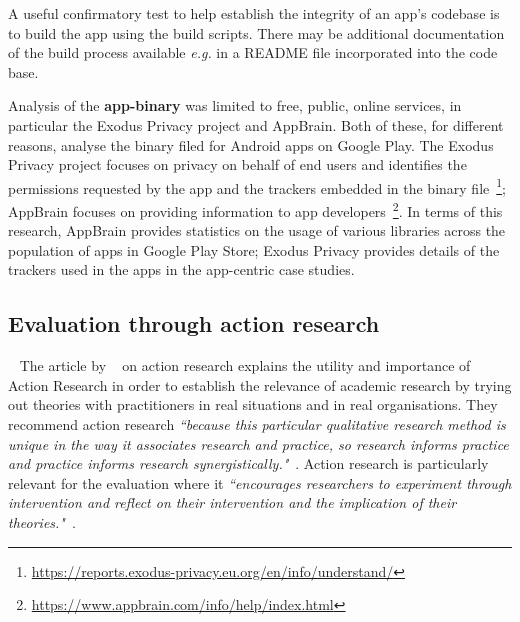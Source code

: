 A useful confirmatory test to help establish the integrity of an app's codebase is to build the app using the build scripts. There may be additional documentation of the build process available \textit{e.g.} in a README file incorporated into the code base.

Analysis of the \textbf{app-binary} was limited to free, public, online services, in particular the Exodus Privacy project and AppBrain. Both of these, for different reasons, analyse the binary filed for Android apps on Google Play. The Exodus Privacy project focuses on privacy on behalf of end users and identifies the permissions requested by the app and the trackers embedded in the binary file~\footnote{\url{https://reports.exodus-privacy.eu.org/en/info/understand/}}; AppBrain focuses on providing information to app developers~\footnote{\url{https://www.appbrain.com/info/help/index.html}}. In terms of this research, AppBrain provides statistics on the usage of various libraries across the population of apps in Google Play Store; Exodus Privacy provides details of the trackers used in the apps in the app-centric case studies.

\subsection{Evaluation through action research}~\label{section-evaluation-through-action-research-method}
The article by ~\citet*{avison1999_action_research} on action research explains the utility and importance of Action Research in order to establish the relevance of academic research by trying out theories with practitioners in real situations and in real organisations. They recommend action research \emph{``because this particular qualitative research method is unique in the way it associates research and practice, so research informs practice and practice informs research synergistically."}~\citep[p.94]{avison1999_action_research}. Action research is particularly relevant for the evaluation where it \emph{``encourages researchers to experiment through intervention and reflect on their intervention and the implication of their theories."}~\citep[p.95]{avison1999_action_research}. 

